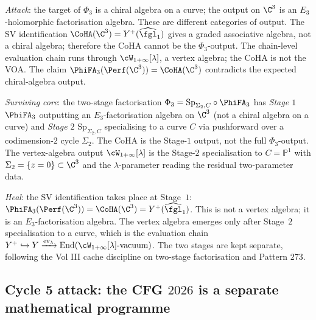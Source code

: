 \begin{remark}
\label{rem:cycle-4-attack-heal-wave10}
\emph{Attack}: the target of $\Phi_3$ is a chiral algebra on a curve;
the output on $\C^3$ is an $E_3$-holomorphic factorisation algebra.
These are different categories of output. The SV identification
$\CoHA(\C^3) = Y^+(\widehat{\fgl}_1)$ gives a graded associative
algebra, not a chiral algebra; therefore the CoHA cannot be the
$\Phi_3$-output. The chain-level evaluation chain runs through
$\cW_{1+\infty}[\lambda]$, a vertex algebra; the CoHA is not the
VOA. The claim $\PhiFA_3(\Perf(\C^3)) = \CoHA(\C^3)$ contradicts the
expected chiral-algebra output.

\emph{Surviving core}: the two-stage factorisation $\Phi_3 =
\mathrm{Sp}_{\Sigma_2, C} \circ \PhiFA_3$ has \emph{Stage $1$}
$\PhiFA_3$ outputting an $E_3$-factorisation algebra on $\C^3$
(not a chiral algebra on a curve) and \emph{Stage $2$}
$\mathrm{Sp}_{\Sigma_2, C}$ specialising to a curve $C$ via pushforward
over a codimension-$2$ cycle $\Sigma_2$. The CoHA is the Stage-$1$
output, not the full $\Phi_3$-output. The vertex-algebra output
$\cW_{1+\infty}[\lambda]$ is the Stage-$2$ specialisation to
$C = \mathbb P^1$ with $\Sigma_2 = \{z = 0\} \subset \C^3$ and the
$\lambda$-parameter reading the residual two-parameter data.

\emph{Heal}: the SV identification takes place at Stage~$1$:
$\PhiFA_3(\Perf(\C^3)) = \CoHA(\C^3) = Y^+(\widehat{\fgl}_1)$. This is
not a vertex algebra; it is an $E_3$-factorisation algebra. The
vertex algebra emerges only after Stage~$2$ specialisation to a curve,
which is the evaluation chain
$Y^+ \hookrightarrow Y \xrightarrow{\mathrm{ev}_\lambda}
\mathrm{End}(\cW_{1+\infty}[\lambda]\text{-vacuum})$. The two stages
are kept separate, following the Vol III cache discipline on two-stage
factorisation and Pattern $273$.
\end{remark}

\subsection*{Cycle 5 attack: the CFG $2026$ is a separate mathematical programme}

